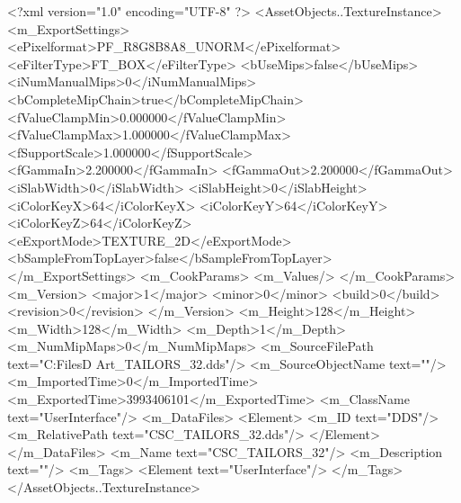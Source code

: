 <?xml version="1.0" encoding="UTF-8" ?>
<AssetObjects..TextureInstance>
	<m_ExportSettings>
		<ePixelformat>PF_R8G8B8A8_UNORM</ePixelformat>
		<eFilterType>FT_BOX</eFilterType>
		<bUseMips>false</bUseMips>
		<iNumManualMips>0</iNumManualMips>
		<bCompleteMipChain>true</bCompleteMipChain>
		<fValueClampMin>0.000000</fValueClampMin>
		<fValueClampMax>1.000000</fValueClampMax>
		<fSupportScale>1.000000</fSupportScale>
		<fGammaIn>2.200000</fGammaIn>
		<fGammaOut>2.200000</fGammaOut>
		<iSlabWidth>0</iSlabWidth>
		<iSlabHeight>0</iSlabHeight>
		<iColorKeyX>64</iColorKeyX>
		<iColorKeyY>64</iColorKeyY>
		<iColorKeyZ>64</iColorKeyZ>
		<eExportMode>TEXTURE_2D</eExportMode>
		<bSampleFromTopLayer>false</bSampleFromTopLayer>
	</m_ExportSettings>
	<m_CookParams>
		<m_Values/>
	</m_CookParams>
	<m_Version>
		<major>1</major>
		<minor>0</minor>
		<build>0</build>
		<revision>0</revision>
	</m_Version>
	<m_Height>128</m_Height>
	<m_Width>128</m_Width>
	<m_Depth>1</m_Depth>
	<m_NumMipMaps>0</m_NumMipMaps>
	<m_SourceFilePath text="C:\Users\Shadow\Desktop\Working Files\2D Art\Quarters\Tailors\CSC_TAILORS_32.dds"/>
	<m_SourceObjectName text=""/>
	<m_ImportedTime>0</m_ImportedTime>
	<m_ExportedTime>3993406101</m_ExportedTime>
	<m_ClassName text="UserInterface"/>
	<m_DataFiles>
		<Element>
			<m_ID text="DDS"/>
			<m_RelativePath text="CSC_TAILORS_32.dds"/>
		</Element>
	</m_DataFiles>
	<m_Name text="CSC_TAILORS_32"/>
	<m_Description text=""/>
	<m_Tags>
		<Element text="UserInterface"/>
	</m_Tags>
</AssetObjects..TextureInstance>

